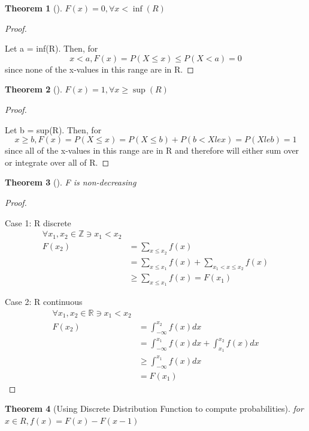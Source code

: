 \documentclass[10pt,]{book}
\theoremstyle{plain}
\newtheorem{theorem}{Theorem}[section]
\theoremstyle{definition}
\theoremstyle{definition}
\theoremstyle{definition}
\numberwithin{equation}{section}
\newcommand{\lt}{ < }
\begin{document}
\begin{theorem}[{}]\label{theorem-Fmin}
\(F(x)=0, \forall x \lt \inf(R)\)\end{theorem}
\begin{proof}\hypertarget{proof-23}{}

		Let a = inf(R). Then, for 
		\begin{equation*}x \lt a, F(x) = P(X \le x) \le P(X \lt a) = 0\end{equation*} 
		since none of the x-values in this range are in R.
\end{proof}
\begin{theorem}[{}]\label{theorem-Fmax}
\(F(x)=1, \forall x \ge \sup(R)\)\end{theorem}
\begin{proof}\hypertarget{proof-24}{}

		Let b = sup(R). Then, for 
		\begin{equation*}x \ge b, F(x) = P(X \le x)  = P(X \le b) + P( b \lt X le x) = P(X le b) = 1\end{equation*} 
		since all of the x-values in this range are in R and therefore will either sum over or integrate over all of R.
\end{proof}
\begin{theorem}[{}]\label{theorem-28}
F is non-decreasing\end{theorem}
\begin{proof}\hypertarget{proof-25}{}
Case 1: R discrete%
\begin{align*}
\forall x_1,x_2 \in \mathbb{Z} \ni x_1 \lt x_2\\
F(x_2) & = \sum_{x \le x_2} f(x) \\
& = \sum_{x \le x_1} f(x) + \sum_{x_1 \lt x \le x_2} f(x)\\
& \ge \sum_{x \le x_1} f(x) = F(x_1)
\end{align*}\par
Case 2: R continuous%
\begin{align*}
\forall x_1,x_2 \in \mathbb{R} \ni x_1 \lt x_2\\
F(x_2) & = \int_{-\infty}^{x_2} f(x) dx \\
 & = \int_{-\infty}^{x_1} f(x) dx + \int_{x_1}^{x_2} f(x) dx\\
 & \ge \int_{-\infty}^{x_1} f(x) dx\\
 & = F(x_1)
\end{align*}\end{proof}
\begin{theorem}[{Using Discrete Distribution Function to compute probabilities}]\label{theorem-Fvsf-discrete}
for \(x \in R, f(x) = F(x) - F(x-1)\)\end{theorem}
\end{document}
